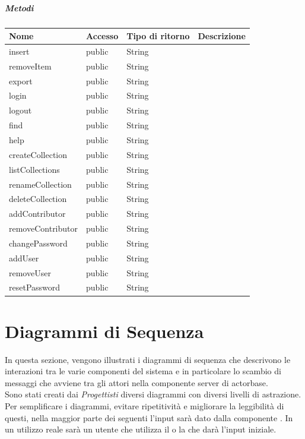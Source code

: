 \documentclass{scalatekids-article}
\begin{document}
\subparagraph{Metodi}

\begin{tabular}{| l | l | l | l |}
	\hline
	Nome & Accesso & Tipo di ritorno & Descrizione\\
	\hline
	insert & public & String & \\
	\hline
	removeItem & public & String & \\
	\hline
	export & public & String & \\
	\hline
	login & public & String & \\
	\hline
	logout & public & String & \\
	\hline
	find & public & String & \\
	\hline
	help & public & String & \\
	\hline
	createCollection & public & String & \\
	\hline
	listCollections & public & String & \\
	\hline
	renameCollection & public & String & \\
	\hline
	deleteCollection & public & String & \\
	\hline
	addContributor & public & String & \\
	\hline
	removeContributor & public & String & \\
	\hline
	changePassword & public & String & \\
	\hline
	addUser & public & String & \\
	\hline
	removeUser & public & String & \\
	\hline
	resetPassword & public & String & \\
	\hline
\end{tabular}

\section{Diagrammi di Sequenza}

In questa sezione, vengono illustrati i diagrammi di sequenza che descrivono
le interazioni tra le varie componenti del sistema e in particolare lo scambio
di messaggi che avviene tra gli attori nella componente server di actorbase.\\
Sono stati creati dai \textit{Progettisti} diversi diagrammi con diversi livelli
di astrazione.\\
Per semplificare i diagrammi, evitare ripetitività e migliorare la leggibilità di
questi, nella maggior parte dei seguenti l'input sarà dato dalla componente . In un utilizzo reale sarà un utente che utilizza il  o la
 che darà l'input iniziale.
\end{document}
